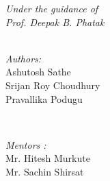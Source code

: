 \documentclass[a4paper, 12pt]{article}
\begin{document}
\begin{titlepage}
\begin{center}
\begin{large}
	\emph{Under the guidance of}\\
	\emph{Prof. Deepak B. Phatak}
\end{large}
\end{center}
\begin{minipage}{0.4\textwidth}
\begin{flushleft} \large
\emph{\\Authors:}\\
Ashutosh Sathe \\%
Srijan Roy Choudhury \\
Pravallika Podugu \\
\end{flushleft}
\end{minipage}
~
\begin{minipage}{0.4\textwidth}
\begin{flushright} \large
%
\emph{Mentors :}\\
Mr. Hitesh Murkute\\
Mr. Sachin Shirsat\\
\end{flushright}
\end{minipage}\\[1.2cm]






\end{titlepage}
\end{document}
